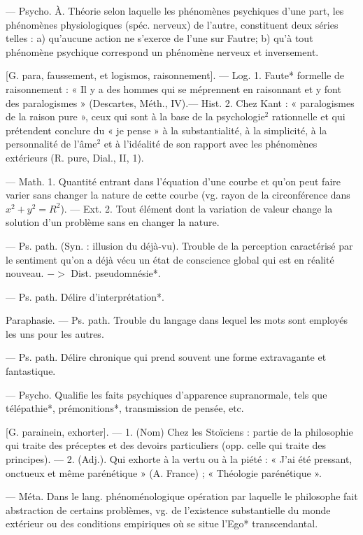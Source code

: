 \begin{itemize}[leftmargin=1cm, label=, itemsep=1pt]
 — Psycho. À. Théorie
selon laquelle les phénomènes psychiques d’une part, les phénomènes
physiologiques (spéc. nerveux) de
l'autre, constituent deux séries
telles : a) qu'aucune action ne
s’exerce de l’une sur Fautre; b) qu’à
tout phénomène psychique correspond un phénomène nerveux et
inversement.

 [G. para, faussement, et
logismos, raisonnement]. — Log. 1.
Faute* formelle de raisonnement :
« Il y a des hommes qui se méprennent
en raisonnant et y font des
paralogismes » (Descartes, Méth.,
IV).— Hist. 2. Chez Kant : « paralogismes de la raison pure », ceux qui
sont à la base de la psychologie$^2$
rationnelle et qui prétendent conclure du « je pense » à la substantialité, à la simplicité, à la personnalité de l’âme$^2$ et à l’idéalité de son
rapport avec les phénomènes extérieurs (R. pure, Dial., II, 1).

 — Math. 1. Quantité
entrant dans l'équation d’une courbe
et qu’on peut faire varier sans
changer la nature de cette courbe
(vg. rayon de la circonférence dans
$x^2+ y^2=R^2$). — Ext. 2. Tout élément dont la variation de valeur
change la solution d’un problème
sans en changer la nature.

 — Ps. path. (Syn. : illusion du déjà-vu). Trouble de la perception caractérisé par le sentiment
qu’on a déjà vécu un état de conscience global qui est en réalité
nouveau. $->$ Dist. pseudomnésie*.

 — Ps. path. Délire d’interprétation*.

Paraphasie. — Ps. path. Trouble du
langage dans lequel les mots sont
employés les uns pour les autres.

 — Ps. path. Délire chronique qui prend souvent une forme
extravagante et fantastique.

 — Psycho. Qualifie les
faits psychiques d'apparence supranormale, tels que télépathie*, prémonitions*, transmission de pensée, etc.

 [G. parainein, exhorter].
— 1. (Nom) Chez les Stoïciens : partie
de la philosophie qui traite des préceptes et des devoirs particuliers
(opp. celle qui traite des principes).
— 2. (Adj.). Qui exhorte à la vertu
ou à la piété : « J’ai été pressant,
onctueux et même parénétique »
(A. France) ; « Théologie parénétique ».

 — Méta.
Dans le lang. phénoménologique
opération par laquelle le philosophe fait abstraction de certains
problèmes, vg. de l'existence substantielle du monde extérieur ou des
conditions empiriques où se situe
l’Ego* transcendantal.


\end{itemize}
